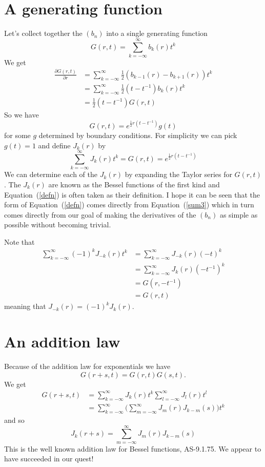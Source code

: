 \documentclass{article}
\begin{document}
\section{A generating function}
Let's collect together the $(b_n)$ into a single generating function
\[
G(r,t) = \sum_{k=-\infty}^\infty b_k(r)t^k
\]
We get
\begin{align*}
\frac{\partial G(r,t)}{\partial r} &= \sum_{k=-\infty}^\infty \frac{1}{2}(b_{k-1}(r)-b_{k+1}(r))t^k\\
&= \sum_{k=-\infty}^\infty \frac{1}{2}(t-t^{-1})b_k(r)t^k \\
&= \frac{1}{2}(t-t^{-1})G(r,t)
\end{align*}
So we have
\[
G(r,t) = e^{\frac{1}{2}r(t-t^{-1})}g(t)
\]
for some $g$ determined by boundary conditions.
For simplicity we can pick $g(t) = 1$ and define $J_k(r)$ by
\begin{equation}
\boxed{\sum_{k=-\infty}^\infty J_k(r)t^k = G(r,t) = e^{\frac{1}{2}r(t-t^{-1})}}\label{defn}
\end{equation}
We can determine each of the $J_k(r)$ by expanding the Taylor series for $G(r, t)$.
The $J_k(r)$ are known as the Bessel functions of the first kind and Equation~(\ref{defn}) is often taken as their definition.
I hope it can be seen that the form of Equation~(\ref{defn}) comes directly from Equation~(\ref{sum3}) which in turn comes directly from our goal of making the derivatives of the $(b_n)$ as simple as possible without becoming trivial.

Note that
\begin{align*}
\sum_{k=-\infty}^\infty (-1)^kJ_{-k}(r)t^k
&= \sum_{k=-\infty}^\infty J_{-k}(r)(-t)^k \\
&= \sum_{k=-\infty}^\infty J_k(r)(-t^{-1})^k \\
&= G(r,-t^{-1}) \\
&= G(r,t)
\end{align*}
meaning that $J_{-k}(r) = (-1)^kJ_{k}(r)$.

\section{An addition law}
Because of the addition law for exponentials we have
\[
G(r+s,t) = G(r,t)G(s,t).
\]
We get
\begin{align*}
G(r+s,t) &= \sum_{k=-\infty}^\infty J_k(r)t^k\sum_{l=-\infty}^\infty J_l(r)t^l\\
&= \sum_{k=-\infty}^\infty \Big(\sum_{m=-\infty}^\infty J_{m}(r)J_{k-m}(s) \Big) t^k
\end{align*}
and so
\[
J_k(r+s) = \sum_{m=-\infty}^\infty J_{m}(r)J_{k-m}(s)
\]
This is the well known addition law for Bessel functions, AS-9.1.75.
We appear to have succeeded in our quest!
\end{document}
